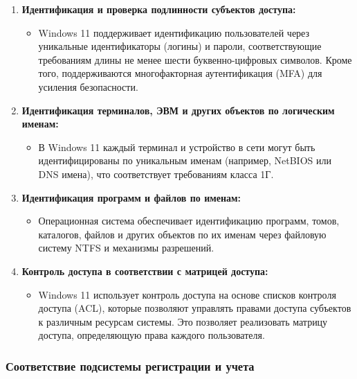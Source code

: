 \documentclass[a4paper, 14pt]{report}
\begin{document}
\begin{enumerate}
    \item \textbf{Идентификация и проверка подлинности субъектов доступа:}
          \begin{itemize}
              \item Windows 11 поддерживает идентификацию пользователей через уникальные идентификаторы (логины) и пароли, соответствующие требованиям длины не менее шести буквенно-цифровых символов. Кроме того, поддерживаются многофакторная аутентификация (MFA) для усиления безопасности.
          \end{itemize}
    \item \textbf{Идентификация терминалов, ЭВМ и других объектов по логическим именам:}
          \begin{itemize}
              \item В Windows 11 каждый терминал и устройство в сети могут быть идентифицированы по уникальным именам (например, NetBIOS или DNS имена), что соответствует требованиям класса 1Г.
          \end{itemize}
    \item \textbf{Идентификация программ и файлов по именам:}
          \begin{itemize}
              \item Операционная система обеспечивает идентификацию программ, томов, каталогов, файлов и других объектов по их именам через файловую систему NTFS и механизмы разрешений.
          \end{itemize}
    \item \textbf{Контроль доступа в соответствии с матрицей доступа:}
          \begin{itemize}
              \item Windows 11 использует контроль доступа на основе списков контроля доступа (ACL), которые позволяют управлять правами доступа субъектов к различным ресурсам системы. Это позволяет реализовать матрицу доступа, определяющую права каждого пользователя.
          \end{itemize}
\end{enumerate}

\subsubsection{Соответствие подсистемы регистрации и учета}
\end{document}
